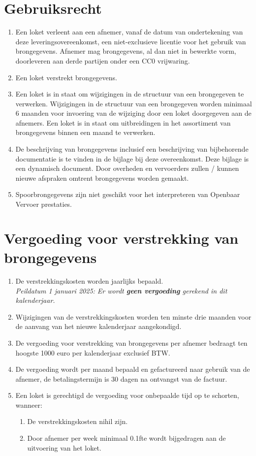 \documentclass[10pt, a4paper]{article}
\begin{document}
\section{Gebruiksrecht}
\begin{enumerate}
   \item Een loket verleent aan een afnemer, vanaf de datum van ondertekening van deze leveringsovereenkomst, een niet-exclusieve licentie voor het gebruik van brongegevens. Afnemer mag brongegevens, al dan niet in bewerkte vorm, doorleveren aan derde partijen onder een CC0 vrijwaring.
   \item Een loket verstrekt brongegevens.
   \item Een loket is in staat om wijzigingen in de structuur van een brongegeven te verwerken. Wijzigingen in de structuur van een brongegeven worden minimaal 6 maanden voor invoering van de wijziging door een loket doorgegeven aan de afnemers. Een loket is in staat om uitbreidingen in het assortiment van brongegevens binnen een maand te verwerken.
   \item De beschrijving van brongegevens inclusief een beschrijving van bijbehorende documentatie is te vinden in de bijlage bij deze overeenkomst. Deze bijlage is een dynamisch document. Door overheden en vervoerders zullen / kunnen nieuwe afspraken omtrent brongegevens worden gemaakt.
   \item Spoorbrongegevens zijn niet geschikt voor het interpreteren van Openbaar Vervoer prestaties.
\end{enumerate}

\section{Vergoeding voor verstrekking van brongegevens}
\begin{enumerate}
   \item De verstrekkingskosten worden jaarlijks bepaald.\\ \textit{Peildatum 1 januari 2025: Er wordt \textbf{geen vergoeding} gerekend in dit kalenderjaar.}
   \item Wijzigingen van de verstrekkingskosten worden ten minste drie maanden voor de aanvang van het nieuwe kalenderjaar aangekondigd.
   \item De vergoeding voor verstrekking van brongegevens per afnemer bedraagt ten hoogste 1000 euro per kalenderjaar exclusief BTW.
   \item De vergoeding wordt per maand bepaald en gefactureerd naar gebruik van de afnemer, de betalingstermijn is 30 dagen na ontvangst van de factuur.
   \item Een loket is gerechtigd de vergoeding voor onbepaalde tijd op te schorten, wanneer:
   \begin{enumerate}
        \item De verstrekkingskosten nihil zijn.
        \item Door afnemer per week minimaal 0.1fte wordt bijgedragen aan de uitvoering van het loket.
   \end{enumerate}
\end{enumerate}
\end{document}
